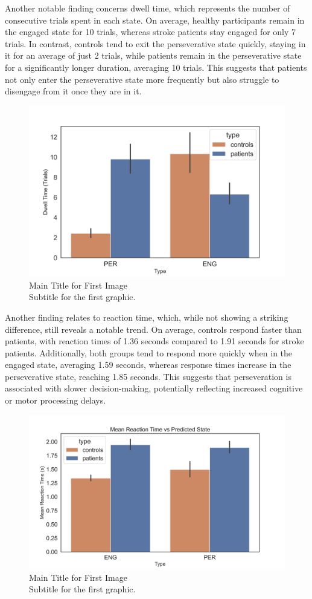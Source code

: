 Another notable finding concerns dwell time, which represents the number of consecutive trials spent in each state. On average, healthy participants remain in the engaged state for 10 trials, whereas stroke patients stay engaged for only 7 trials. In contrast, controls tend to exit the perseverative state quickly, staying in it for an average of just 2 trials, while patients remain in the perseverative state for a significantly longer duration, averaging 10 trials. This suggests that patients not only enter the perseverative state more frequently but also struggle to disengage from it once they are in it.
\begin{figure}[H]
    \centering
    \includegraphics[width=12cm]{MainLayout/Images/chapter7/dwell_time_state.jpg}
    \caption{Main Title for First Image \\ \small Subtitle for the first graphic.}
    \label{fig:dwell_time_state}
\end{figure}
Another finding relates to reaction time, which, while not showing a striking difference, still reveals a notable trend. On average, controls respond faster than patients, with reaction times of 1.36 seconds compared to 1.91 seconds for stroke patients. Additionally, both groups tend to respond more quickly when in the engaged state, averaging 1.59 seconds, whereas response times increase in the perseverative state, reaching 1.85 seconds. This suggests that perseveration is associated with slower decision-making, potentially reflecting increased cognitive or motor processing delays.  
\begin{figure}[H]
    \centering
    \includegraphics[width=12cm]{MainLayout/Images/chapter7/rt_predicted_state.jpg}
    \caption{Main Title for First Image \\ \small Subtitle for the first graphic.}
    \label{fig:rt_predicted_state}
\end{figure}
